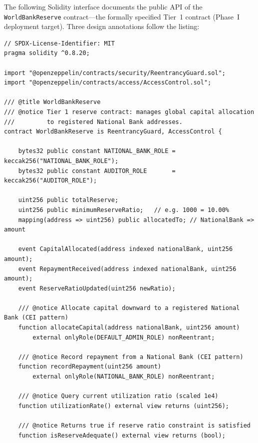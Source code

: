 \documentclass[12pt,a4paper]{report}
\begin{document}
The following Solidity interface documents the public API of the \texttt{WorldBankReserve} contract---the formally specified Tier~1 contract (Phase~I deployment target). Three design annotations follow the listing:

\begin{lstlisting}[language=Solidity,basicstyle=\ttfamily\scriptsize,breaklines=true,
    commentstyle=\color{GrayText},keywordstyle=\color{PrimaryBlue}\bfseries,
    frame=single,rulecolor=\color{AccentBlue!40},captionpos=b,
    caption={WorldBankReserve.sol -- Tier 1 public interface. Full implementation in project repository.}]
// SPDX-License-Identifier: MIT
pragma solidity ^0.8.20;

import "@openzeppelin/contracts/security/ReentrancyGuard.sol";
import "@openzeppelin/contracts/access/AccessControl.sol";

/// @title WorldBankReserve
/// @notice Tier 1 reserve contract: manages global capital allocation
///         to registered National Bank addresses.
contract WorldBankReserve is ReentrancyGuard, AccessControl {

    bytes32 public constant NATIONAL_BANK_ROLE = keccak256("NATIONAL_BANK_ROLE");
    bytes32 public constant AUDITOR_ROLE       = keccak256("AUDITOR_ROLE");

    uint256 public totalReserve;
    uint256 public minimumReserveRatio;   // e.g. 1000 = 10.00%
    mapping(address => uint256) public allocatedTo; // NationalBank => amount

    event CapitalAllocated(address indexed nationalBank, uint256 amount);
    event RepaymentReceived(address indexed nationalBank, uint256 amount);
    event ReserveRatioUpdated(uint256 newRatio);

    /// @notice Allocate capital downward to a registered National Bank (CEI pattern)
    function allocateCapital(address nationalBank, uint256 amount)
        external onlyRole(DEFAULT_ADMIN_ROLE) nonReentrant;

    /// @notice Record repayment from a National Bank (CEI pattern)
    function recordRepayment(uint256 amount)
        external onlyRole(NATIONAL_BANK_ROLE) nonReentrant;

    /// @notice Query current utilization ratio (scaled 1e4)
    function utilizationRate() external view returns (uint256);

    /// @notice Returns true if reserve ratio constraint is satisfied
    function isReserveAdequate() external view returns (bool);


\end{lstlisting}
\end{document}
